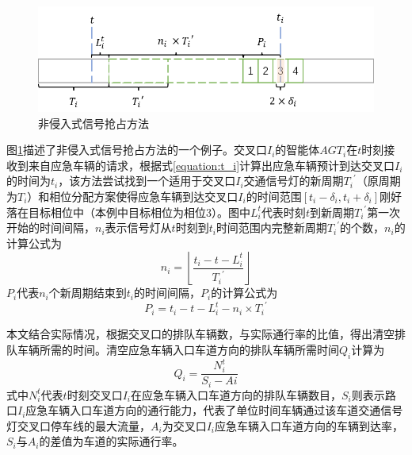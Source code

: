 \begin{figure}[ht]
	\centering
	\includegraphics[width=\textwidth]{figures/non-invasive.png}
	\caption{非侵入式信号抢占方法}
	\label{fig:non-invasive}
\end{figure}

图\ref{fig:non-invasive}描述了非侵入式信号抢占方法的一个例子。交叉口${I_i}$的智能体${AGT_i}$在${t}$时刻接收到来自应急车辆的请求，根据式\ref{equation:t_i}计算出应急车辆预计到达交叉口${I_i}$的时间为${t_i}$，该方法尝试找到一个适用于交叉口${I_i}$交通信号灯的新周期${{T_i}^\prime}$（原周期为${T_i}$）和相位分配方案使得应急车辆到达交叉口${I_i}$的时间范围${[t_i-\delta_i, t_i+\delta_i]}$刚好落在目标相位中（本例中目标相位为相位3）。图中${L_i^t}$代表时刻${t}$到新周期${{T_i}^\prime}$第一次开始的时间间隔，${n_i}$表示信号灯从${t}$时刻到${t_i}$时间范围内完整新周期${{T_i}^\prime}$的个数，${n_i}$的计算公式为
\begin{equation}
	\label{equation:ni}
	n_i=\left\lfloor\frac{t_i-t-L_i^t}{{T_i}^\prime}\right\rfloor
\end{equation}
${P_i}$代表${n_i}$个新周期结束到${t_i}$的时间间隔，${P_i}$的计算公式为
\begin{equation}
	\label{equation:pi}
	P_i=t_i-t-L_i^t-n_i\times{{T_i}^\prime}
\end{equation}

本文结合实际情况，根据交叉口的排队车辆数，与实际通行率的比值，得出清空排队车辆所需的时间。清空应急车辆入口车道方向的排队车辆所需时间${Q_i}$计算为
\begin{equation}
	\label{equation:qi}
	Q_i=\frac{N_i^t}{S_i-Ai}
\end{equation}
式中${N_i^t}$代表${t}$时刻交叉口${I_i}$在应急车辆入口车道方向的排队车辆数目，${S_i}$则表示路口${I_i}$应急车辆入口车道方向的通行能力，代表了单位时间车辆通过该车道交通信号灯交叉口停车线的最大流量，${A_i}$为交叉口${I_i}$应急车辆入口车道方向的车辆到达率，${S_i}$与${A_i}$的差值为车道的实际通行率。

